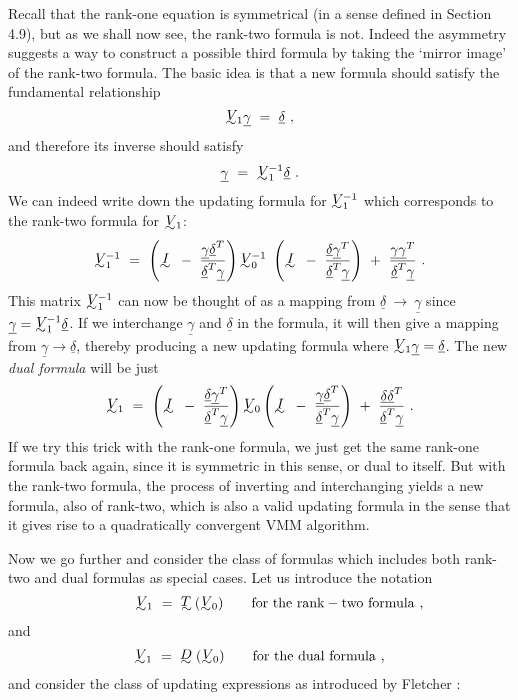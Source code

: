      Recall that the rank-one equation is symmetrical (in a sense defined
in Section 4.9), but as we shall now see, the rank-two formula is not.
Indeed the asymmetry suggests a way to construct a possible third
formula
by taking the `mirror image' of the rank-two formula.  The basic idea is
that a new formula should satisfy the fundamental relationship
 $$\UTV\!\!_1{\underline{\gamma}}~=~{\underline{\delta}}~,$$
 and therefore its inverse should satisfy
 $${\underline{\gamma}}~=~\UTV\!\!_1^{-1}{\underline{\delta}}~.$$
 We can indeed write down the updating formula for $\UTV\!\!_1^{-1}$ which
corresponds to the rank-two formula for $\UTV\!\!_1$:
 $$\UTV\!\!_1^{-1}~=~\left(\UTI~-~{{\underline{\gamma}} {\underline{\delta}}^T\over
{\underline{\delta}}^T{\underline{\gamma}}}\right)
\UTV\!\!_0^{-1}~\left(\UTI~-~{{\underline{\delta}} {\underline{\gamma}}^T\over
{\underline{\delta}}^T{\underline{\gamma}}}\right)~+~
{{\underline{\gamma}}{\underline{\gamma}}^T\over
{\underline{\delta}}^T{\underline{\gamma}}}~.$$
This matrix $\UTV\!\!_1^{-1}$ can now be thought of as a mapping
from  ${\underline{\delta}}~\to~{\underline{\gamma}}$ since ${\underline{\gamma}} = \UTV\!\!_1^{-1}
{\underline{\delta}}$.  If we interchange ${\underline{\gamma}}$ and ${\underline{\delta}}$ 
in the formula, it
will then give a mapping from ${\underline{\gamma}} \to {\underline{\delta}}$, thereby
 producing a new updating formula
where $\UTV\!\!_1{\underline{\gamma}} = {\underline{\delta}}$.  The new {\em dual
 formula} will be just
 $$\UTV\!\!_1~=~\left(\UTI~-~{{\underline{\delta}}{\underline{\gamma}}^T\over
{\underline{\delta}}^T{\underline{\gamma}}}\right)\UTV\!\!_0
\left(\UTI~-~{{\underline{\gamma}}{\underline{\delta}}^T\over
{\underline{\delta}}^T{\underline{\gamma}}}\right)~+~
{{\underline{\delta}}{\underline{\delta}}^T\over {\underline{\delta}}^T{\underline{\gamma}}}~.$$
If we try this trick with the rank-one
formula, we just get the same rank-one formula back again, since it is symmetric in this sense, or
dual to itself.  But with the rank-two formula, the process of inverting
and interchanging yields a new formula, also of rank-two, which is also
a valid updating formula in the sense that it gives rise to a quadratically convergent VMM
algorithm.
 
     Now we go further and consider the class of formulas which includes
both rank-two and dual formulas as special cases.  Let us introduce the
notation
                   $${\phantom{xxxxx}}\UTV\!\!_1~=~\UTT(\UTV\!\!_0)\qquad   {\rm
for~the~rank-two~formula}~,$$ and
                   $$\UTV\!\!_1~=~\UTD(\UTV\!\!_0)\qquad   {\rm for~the~dual~formula}~,$$
 and consider the class of updating expressions as introduced by
Fletcher \cite{Flet2}:
 
